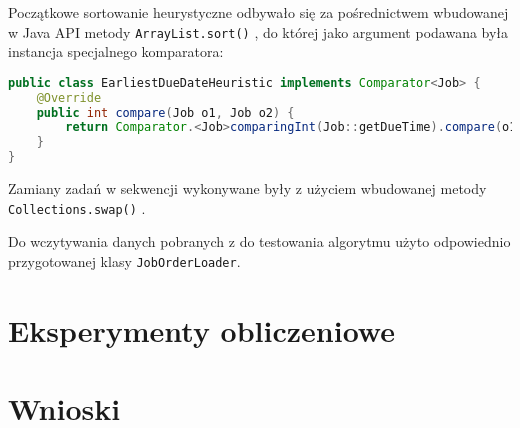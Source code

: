 \documentclass[polish,polish,a4paper]{article}
\begin{document}
Początkowe sortowanie heurystyczne odbywało się za pośrednictwem wbudowanej w Java API metody\newline
\texttt{ArrayList.sort()} \cite{JavaDocs}, do której jako argument podawana była instancja specjalnego komparatora:

\begin{lstlisting}[language=Java]
public class EarliestDueDateHeuristic implements Comparator<Job> {
	@Override
	public int compare(Job o1, Job o2) {
		return Comparator.<Job>comparingInt(Job::getDueTime).compare(o1, o2);
	}
}
\end{lstlisting}

Zamiany zadań w sekwencji wykonywane były z użyciem wbudowanej metody \texttt{Collections.swap()} \cite{JavaDocs}.

Do wczytywania danych pobranych z \cite{ORLib} do testowania algorytmu użyto odpowiednio przygotowanej klasy \texttt{JobOrderLoader}.


\section{Eksperymenty obliczeniowe}

\section{Wnioski}



\end{document}
